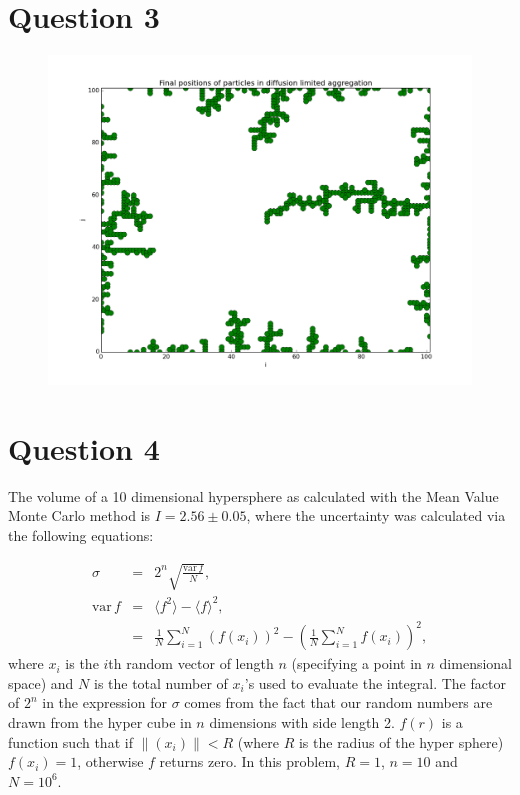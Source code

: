 \documentclass[a4paper,12pt]{article}
\begin{document}
\section{Question 3}

\begin{figure}[H]
\centering
\includegraphics[width = \linewidth]{lab10_q3.png}
\caption{}
\label{fig:q3}
\end{figure}

\section{Question 4}

The volume of a 10 dimensional hypersphere as calculated with the Mean Value Monte Carlo method is $I = 2.56 \pm 0.05$, where the uncertainty was calculated via the following equations:

\begin{eqnarray}
\sigma &=& 2^{n}\sqrt{\frac{\mathrm{var}\,f}{N}},\nonumber\\
\mathrm{var}\, f &=& \langle f^2\rangle - \langle f\rangle^2,\nonumber\\
&=& \frac{1}{N}\sum_{i=1}^N(f(x_i))^2 - \left(\frac{1}{N}\sum_{i=1}^N f(x_i)\right)^2,
\end{eqnarray}
%
where $x_i$ is the $i$th random vector of length $n$ (specifying a point in $n$ dimensional space) and $N$ is the total number of $x_i$'s used to evaluate the integral.  The factor of $2^n$ in the expression for $\sigma$ comes from the fact that our random numbers are drawn from the hyper cube in $n$ dimensions with side length 2. $f(r)$ is a function such that if $\|{(x_i)}\| < R$ (where $R$ is the radius of the hyper sphere) $f(x_i) = 1$, otherwise $f$ returns zero. In this problem, $R = 1$, $n = 10$ and $N = 10^6$.
\end{document}
